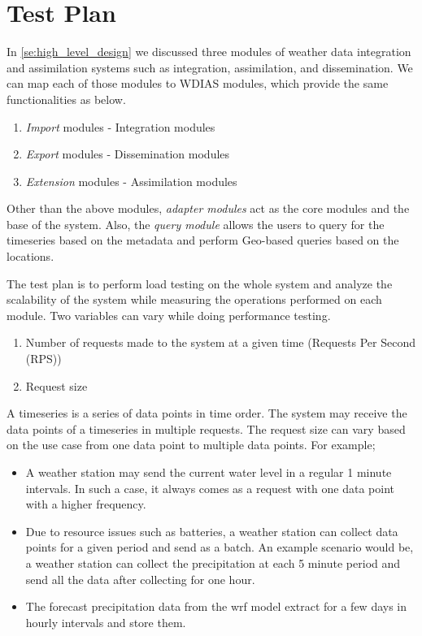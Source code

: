 \section{Test Plan}
\label{se:test_plan}

In \cref{se:high_level_design} we discussed three modules of weather data integration and assimilation systems such as integration, assimilation, and dissemination. We can map each of those modules to WDIAS modules, which provide the same functionalities as below.
\begin{enumerate}
    \item \emph{Import} modules - Integration modules
    \item \emph{Export} modules - Dissemination modules
    \item \emph{Extension} modules - Assimilation modules
\end{enumerate}

Other than the above modules, \emph{adapter modules} act as the core modules and the base of the system. Also, the \emph{query module} allows the users to query for the timeseries based on the metadata and perform Geo-based queries based on the locations.

The test plan is to perform load testing on the whole system and analyze the scalability of the system while measuring the operations performed on each module. Two variables can vary while doing performance testing.
\begin{enumerate}
    \item Number of requests made to the system at a given time (Requests Per Second (RPS))
    \item Request size
\end{enumerate}

A timeseries is a series of data points in time order. The system may receive the data points of a timeseries in multiple requests. The request size can vary based on the use case from one data point to multiple data points. For example;
\begin{itemize}
    \item A weather station may send the current water level in a regular 1 minute intervals. In such a case, it always comes as a request with one data point with a higher frequency.
    \item Due to resource issues such as batteries, a weather station can collect data points for a given period and send as a batch. An example scenario would be, a weather station can collect the precipitation at each 5 minute period and send all the data after collecting for one hour.
    \item The forecast precipitation data from the \acrshort{wrf} model extract for a few days in hourly intervals and store them.
\end{itemize}

